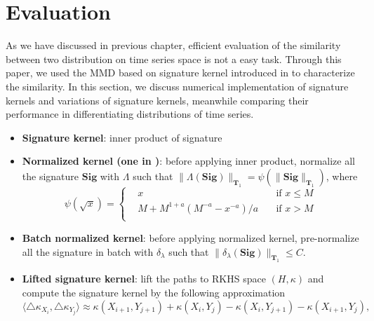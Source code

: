 \documentclass[12pt]{report}
\theoremstyle{definition}
\theoremstyle{remark}
\begin{document}
\section{Evaluation}
As we have discussed in previous chapter, efficient evaluation of the similarity between two distribution on time series space is not a easy task. Through this paper, we used the MMD based on signature kernel introduced in \cite{chevyrev2018signature} to characterize the similarity. In this section, we discuss numerical implementation of signature kernels and variations of signature kernels, meanwhile comparing their performance in differentiating distributions of time series. 
\begin{itemize}
     \item \textbf{Signature kernel}: inner product of signature 
     \item \textbf{Normalized kernel (one in \cite{chevyrev2018signature})}: before applying inner product, normalize all the signature $\mathbf{Sig}$ with $\Lambda$ such that $\lVert \Lambda(\mathbf{Sig})\rVert_{\mathbf{T}_{1}} = \psi(\lVert \mathbf{Sig}\rVert_{\mathbf{T}_{1}})$, where 
     \begin{equation*}
       \psi(\sqrt{x}) = \left\{\begin{aligned}
         &x  &\text{if } x\leq M\\
         &M + M^{1+a}(M^{-a} - x^{-a})/a\quad &\text{if } x> M\\
       \end{aligned}\right.
     \end{equation*}
     \item \textbf{Batch normalized kernel}: before applying normalized kernel, pre-normalize all the signature in batch with $\delta_{\lambda}$ such that $\lVert \delta_{\lambda}(\mathbf{Sig})\rVert_{\mathbf{T}_{1}} \leq C$.
     \item \textbf{Lifted signature kernel}: lift the paths to RKHS space $(H,\kappa)$ and compute the signature kernel by the following approximation
     \begin{equation}\label{approkernel}
      \langle\triangle\kappa_{X_{i}}, \triangle\kappa_{Y_{j}}\rangle\approx\kappa(X_{i+1},Y_{j+1}) + \kappa(X_{i},Y_{j}) - \kappa(X_{i},Y_{j+1}) - \kappa(X_{i+1},Y_{j}),
    \end{equation}
\end{itemize}
\end{document}
